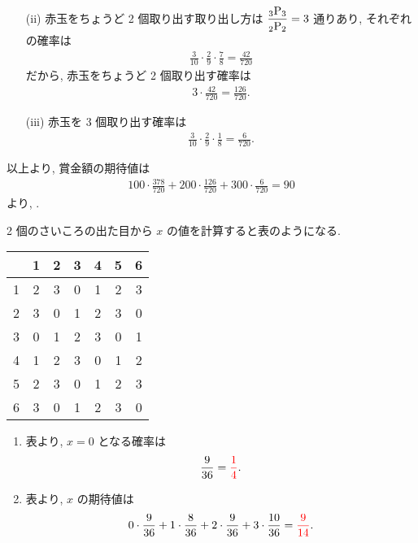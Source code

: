 \begin{qenumerate}
{\begin{enumerate}
{\begin{align}
					3\cdot\frac{126}{720} = \frac{378}{720}.
				\end{align}
			}
			\item[(ii)]{
				赤玉をちょうど 2 個取り出す取り出し方は $\dfrac{{{}_{3}\mathrm{P}_{3}}}{{{}_{2}\mathrm{P}_{2}}} = 3$ 通りあり, それぞれの確率は
				\begin{align}
					\frac{3}{10}\cdot\frac{2}{9}\cdot\frac{7}{8} = \frac{42}{720}
				\end{align}
				だから, 赤玉をちょうど 2 個取り出す確率は
				\begin{align}
					3\cdot\frac{42}{720} = \frac{126}{720}.
				\end{align}
			}
			\item[(iii)]{
				赤玉を 3 個取り出す確率は
				\begin{align}
					\frac{3}{10}\cdot\frac{2}{9}\cdot\frac{1}{8} = \frac{6}{720}.
				\end{align}
			}
		\end{enumerate}
		以上より, 賞金額の期待値は
		\begin{align}
			100\cdot\frac{378}{720} + 200\cdot\frac{126}{720} + 300\cdot\frac{6}{720} = 90
		\end{align}
		より, .
	}
	\item{
		2 個のさいころの出た目から $x$ の値を計算すると表のようになる.
		\begin{table}[H]
			\centering
			\begin{tabular}{c|cccccc}
				& 1 & 2 & 3 & 4 & 5 & 6 \\ \hline
				1 & 2 & 3 & 0 & 1 & 2 & 3 \\
				2 & 3 & 0 & 1 & 2 & 3 & 0 \\
				3 & 0 & 1 & 2 & 3 & 0 & 1 \\
				4 & 1 & 2 & 3 & 0 & 1 & 2 \\
				5 & 2 & 3 & 0 & 1 & 2 & 3 \\
				6 & 3 & 0 & 1 & 2 & 3 & 0
			\end{tabular}
		\end{table}
		\begin{enumerate}
			\item{
				表より, $x = 0$ となる確率は
				\begin{align}
					\frac{9}{36} = \textcolor{red}{\frac{1}{4}}.
				\end{align}
			}
			\item{
				表より, $x$ の期待値は
				\begin{align}
					0\cdot\frac{9}{36} + 1\cdot\frac{8}{36} + 2\cdot\frac{9}{36} + 3\cdot\frac{10}{36} = \textcolor{red}{\frac{9}{14}}.
				\end{align}
				}
		\end{enumerate}
	}
\end{qenumerate}

